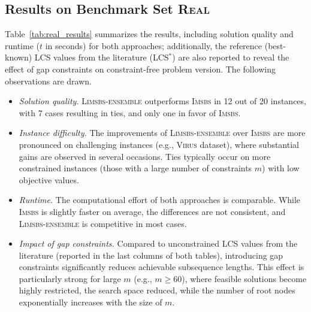 \documentclass[runningheads]{llncs}
\begin{document}
\subsection{Results on Benchmark Set \textsc{Real}}


Table~\ref{tab:real_results} summarizes the results, including solution quality and runtime ($t$ in seconds) for both approaches; additionally, the reference (best-known) LCS values from the literature (LCS$^*$) are also reported to reveal the effect of gap constraints on constraint-free problem version. The following observations are drawn.

\begin{itemize}
	\item \textit{Solution quality.} \textsc{Limsbs-ensemble} outperforms \textsc{Imsbs} in 12 out of 20 instances, with 7 cases resulting in ties, and only one in favor of \textsc{Imsbs}. %
	
	
	\item \textit{Instance difficulty.} The improvements of \textsc{Limsbs-ensemble} over \textsc{Imsbs} are more pronounced on challenging instances (e.g., \textsc{Virus} dataset), where substantial gains are observed in several occasions. Ties typically occur on more constrained instances (those with a large number of constraints $m$) with low objective values.
	
	\item \textit{Runtime.} The computational effort of both approaches is comparable. While \textsc{Imsbs} is slightly faster on average, the differences are not consistent, and \textsc{Limsbs-ensemble} is competitive in most cases.
	
	\item \textit{Impact of gap constraints.} Compared to unconstrained LCS values from the literature (reported in the last columns of both tables), introducing gap constraints significantly reduces achievable subsequence lengths. This effect is particularly strong for large $m$ (e.g., $m \geq 60$), where feasible solutions become highly restricted, the search space reduced, while the number of root nodes exponentially  increases with the size of $m$. 
\end{itemize}
\end{document}
